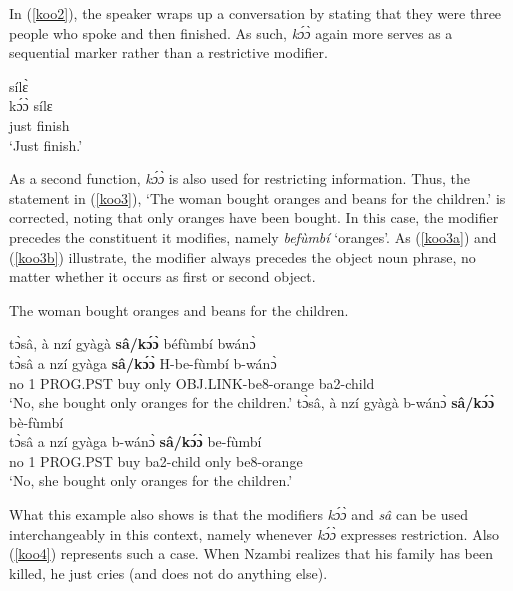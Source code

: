 In (\ref{koo2}), the speaker wraps up a conversation by stating that they were three people who spoke and then finished. As such, {\itshape kɔ́ɔ̀} again more serves as a sequential marker rather than a restrictive modifier.

\begin{exe} 
\ex\label{koo2} 
   sílɛ̀ \\
        kɔ́ɔ̀ sílɛ \\
       just finish   \\
    \trans `Just finish.'
\end{exe}

As a second function, {\itshape kɔ́ɔ̀} is also used for restricting information. Thus, the statement in (\ref{koo3}), `The woman bought oranges and beans for the children.' is corrected, noting that only oranges have been bought. In this case, the modifier precedes the constituent it modifies, namely {\itshape befùmbí} `oranges'. As (\ref{koo3a}) and (\ref{koo3b}) illustrate, the modifier always precedes the object noun phrase, no matter whether it occurs as first or second object.

\begin{exe} 
\ex\label{koo3} The woman bought oranges and beans for the children.
\begin{xlist}
\ex\label{koo3a}
   \glll tɔ̀sâ, à nzí gyàgà {\bfseries sâ/kɔ́ɔ̀} béfùmbí bwánɔ̀ \\
          tɔ̀sâ a nzí gyàga {\bfseries sâ/kɔ́ɔ̀} H-be-fùmbí b-wánɔ̀ \\
        no 1 PROG.PST buy only OBJ.LINK-be8-orange ba2-child \\
    \trans `No, she bought only oranges for the children.'
\ex \label{koo3b}
   \glll tɔ̀sâ, à nzí gyàgà b-wánɔ̀ {\bfseries sâ/kɔ́ɔ̀} bè-fùmbí \\
     tɔ̀sâ a nzí gyàga b-wánɔ̀ {\bfseries sâ/kɔ́ɔ̀} be-fùmbí \\
        no 1 PROG.PST buy ba2-child only be8-orange  \\
    \trans `No, she bought only oranges for the children.'
\end {xlist}
\end{exe}

\noindent What this example also shows is that the modifiers {\itshape kɔ́ɔ̀} and {\itshape sâ} can be used interchangeably in this context, namely whenever {\itshape kɔ́ɔ̀} expresses restriction. Also (\ref{koo4}) represents such a case. When Nzambi realizes that his family has been killed, he just cries (and does not do anything else). 

